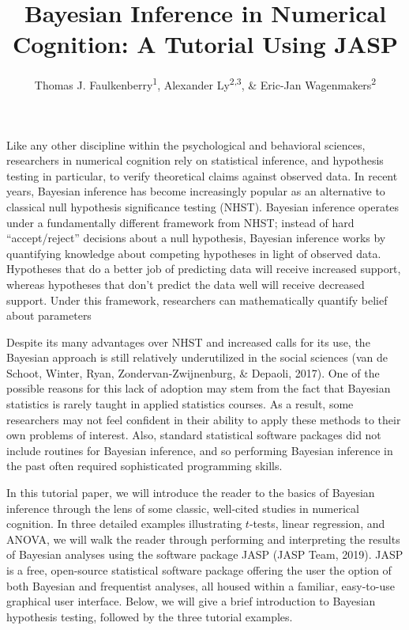 \documentclass[english,,doc,floatsintext]{apa6}
\title{Bayesian Inference in Numerical Cognition: A Tutorial Using JASP}
\author{Thomas J. Faulkenberry\textsuperscript{1}, Alexander Ly\textsuperscript{2,3}, \& Eric-Jan Wagenmakers\textsuperscript{2}}
\date{}
\affiliation{
\vspace{0.5cm}
\textsuperscript{1} Tarleton State University\\\textsuperscript{2} University of Amsterdam\\\textsuperscript{3} Centrum Wiskunde \& Informatica}
\begin{document}
\maketitle

Like any other discipline within the psychological and behavioral sciences, researchers in numerical cognition rely on statistical inference, and hypothesis testing in particular, to verify theoretical claims against observed data. In recent years, Bayesian inference has become increasingly popular as an alternative to classical null hypothesis significance testing (NHST). Bayesian inference operates under a fundamentally different framework from NHST; instead of hard \enquote{accept/reject} decisions about a null hypothesis, Bayesian inference works by quantifying knowledge about competing hypotheses in light of observed data. Hypotheses that do a better job of predicting data will receive increased support, whereas hypotheses that don't predict the data well will receive decreased support. Under this framework, researchers can mathematically quantify belief about parameters

Despite its many advantages over NHST and increased calls for its use, the Bayesian approach is still relatively underutilized in the social sciences (van de Schoot, Winter, Ryan, Zondervan-Zwijnenburg, \& Depaoli, 2017). One of the possible reasons for this lack of adoption may stem from the fact that Bayesian statistics is rarely taught in applied statistics courses. As a result, some researchers may not feel confident in their ability to apply these methods to their own problems of interest. Also, standard statistical software packages did not include routines for Bayesian inference, and so performing Bayesian inference in the past often required sophisticated programming skills.

In this tutorial paper, we will introduce the reader to the basics of Bayesian inference through the lens of some classic, well-cited studies in numerical cognition. In three detailed examples illustrating \(t\)-tests, linear regression, and ANOVA, we will walk the reader through performing and interpreting the results of Bayesian analyses using the software package JASP (JASP Team, 2019). JASP is a free, open-source statistical software package offering the user the option of both Bayesian and frequentist analyses, all housed within a familiar, easy-to-use graphical user interface. Below, we will give a brief introduction to Bayesian hypothesis testing, followed by the three tutorial examples.
\end{document}
